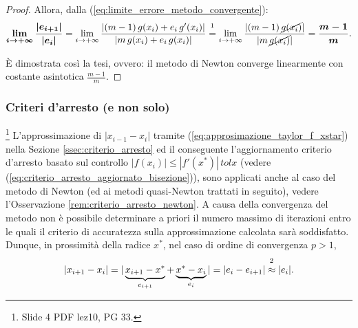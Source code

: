 \begin{proof}
	
	
	
	\noindent Allora, dalla (\ref{eq:limite_errore_metodo_convergente}):
	\begin{equation} \label{eq:newton_costante_asintotica_convergenza_lineare}
		\boldsymbol{\lim_{i\to + \infty}{\frac{|e_{i+1}|}{|e_i|}}}=\lim_{i\to + \infty}{\frac{|(m-1)\,g(x_i)+e_i\,g'(x_i)|}{|m\,g(x_i)+e_i\,g(x_i)|}}\overset{\footnotemark}{=}\lim_{i\to + \infty}{\frac{|(m-1)\,\cancel{g(x_i)}|}{|m\,\cancel{g(x_i)}|}}=\boldsymbol{\frac{m-1}{m}}.
	\end{equation}
	
	
	\noindent È dimostrata così la tesi, ovvero: il metodo di Newton converge linearmente con costante asintotica $\frac{m-1}{m}$.
\end{proof}

\subsubsection{Criteri d'arresto (e non solo)}
\footnote{Slide 4 PDF lez10, PG 33.}
L'approssimazione di $|x_{i-1}-x_i|$ tramite (\ref{eq:approsimazione_taylor_f_xstar}) nella Sezione \ref{ssec:criterio_arresto} ed il conseguente l'aggiornamento criterio d'arresto basato sul controllo $|f(x_i)|\leq|f'(x^*)|\, tolx$ (vedere (\ref{eq:criterio_arresto_aggiornato_bisezione})), sono applicati anche al caso del metodo di Newton (ed ai metodi quasi-Newton trattati in seguito), vedere l'Osservazione \ref{rem:criterio_arresto_newton}. A causa della convergenza del metodo non è possibile determinare a priori il numero massimo di iterazioni entro le quali il criterio di accuratezza sulla approssimazione calcolata sarà soddisfatto. Dunque, in prossimità della radice $x^*$, nel caso di ordine di convergenza $p>1$,
\begin{equation}\label{eq:errore_metodo_newton}
	|x_{i+1}-x_i|=|\underbrace{x_{i+1}-x^*}_{\text{$e_{i+1}$}}+\underbrace{x^*-x_i}_{\text{$e_{i}$}}|=|e_i-e_{i+1}|\overset{\footnotemark}{\approx}|e_i|.
\end{equation}

